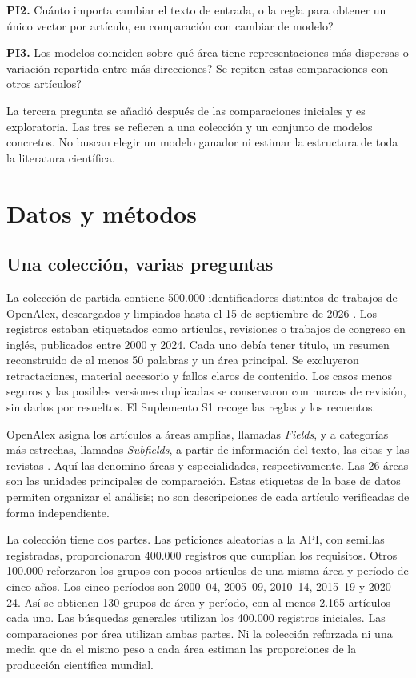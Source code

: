 \documentclass[12pt]{article}
\begin{document}
\textbf{PI2.} \textquestiondown{}Cuánto importa cambiar el texto de entrada, o la regla para obtener un único vector por artículo, en comparación con cambiar de modelo?

\textbf{PI3.} \textquestiondown{}Los modelos coinciden sobre qué área tiene representaciones más dispersas o variación repartida entre más direcciones? \textquestiondown{}Se repiten estas comparaciones con otros artículos?

La tercera pregunta se añadió después de las comparaciones iniciales y es exploratoria. Las tres se refieren a una colección y un conjunto de modelos concretos. No buscan elegir un modelo ganador ni estimar la estructura de toda la literatura científica.

\clearpage
\section{Datos y métodos}
\subsection{Una colección, varias preguntas}
La colección de partida contiene 500.000 identificadores distintos de trabajos de OpenAlex, descargados y limpiados hasta el 15 de septiembre de 2026 \citep{priem2022openalex}. Los registros estaban etiquetados como artículos, revisiones o trabajos de congreso en inglés, publicados entre 2000 y 2024. Cada uno debía tener título, un resumen reconstruido de al menos 50 palabras y un área principal. Se excluyeron retractaciones, material accesorio y fallos claros de contenido. Los casos menos seguros y las posibles versiones duplicadas se conservaron con marcas de revisión, sin darlos por resueltos. El Suplemento S1 recoge las reglas y los recuentos.

OpenAlex asigna los artículos a áreas amplias, llamadas \emph{Fields}, y a categorías más estrechas, llamadas \emph{Subfields}, a partir de información del texto, las citas y las revistas \citep{openalex2026topics}. Aquí las denomino áreas y especialidades, respectivamente. Las 26 áreas son las unidades principales de comparación. Estas etiquetas de la base de datos permiten organizar el análisis; no son descripciones de cada artículo verificadas de forma independiente.

La colección tiene dos partes. Las peticiones aleatorias a la API, con semillas registradas, proporcionaron 400.000 registros que cumplían los requisitos. Otros 100.000 reforzaron los grupos con pocos artículos de una misma área y período de cinco años. Los cinco períodos son 2000--04, 2005--09, 2010--14, 2015--19 y 2020--24. Así se obtienen 130 grupos de área y período, con al menos 2.165 artículos cada uno. Las búsquedas generales utilizan los 400.000 registros iniciales. Las comparaciones por área utilizan ambas partes. Ni la colección reforzada ni una media que da el mismo peso a cada área estiman las proporciones de la producción científica mundial.
\end{document}
